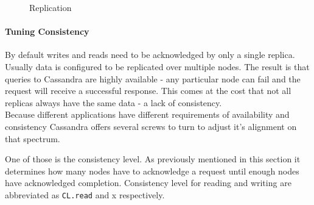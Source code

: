 \begin{figure}[ht]
  \centering
  \caption{Replication}
  \label{fig:cassandra:replication}
\end{figure}

\paragraph{Tuning Consistency} By default writes and reads need to be acknowledged by only a single replica. Usually data is configured to be replicated over multiple nodes. The result is that queries to Cassandra are highly available - any particular node can fail and the request will receive a successful response. This comes at the cost that not all replicas always have the same data - a lack of consistency. \\
Because different applications have different requirements of availability and consistency Cassandra offers several screws to turn to adjust it's alignment on that spectrum.

One of those is the consistency level. As previously mentioned in this section it determines how many nodes have to acknowledge a request until enough nodes have acknowledged completion. Consistency level for reading and writing are abbreviated as \texttt{CL.read} and x respectively.


